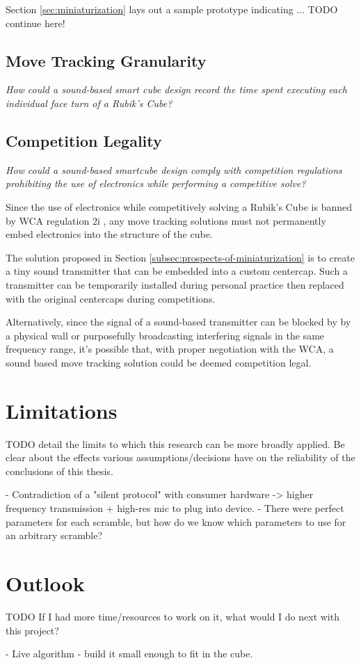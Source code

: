 Section \ref{sec:miniaturization} lays out a sample prototype indicating ... TODO continue here!

\subsection{Move Tracking Granularity}
\label{subsec:answer-granularity}

\emph{How could a sound-based smart cube design record the time spent
executing each individual face turn of a Rubik's Cube?}



\subsection{Competition Legality}
\label{subsec:answer-competition-legality}

\emph{How could a sound-based smartcube design comply with competition
regulations prohibiting the use of electronics while performing a
competitive solve?}

Since the use of electronics while competitively solving a Rubik's Cube
is banned by WCA regulation 2i \cite{wca-regulations}, any move
tracking solutions must not permanently embed electronics into the
structure of the cube.

The solution proposed in Section
\ref{subsec:prospects-of-miniaturization} is to create a tiny sound
transmitter that can be embedded into a custom centercap. Such a
transmitter can be temporarily installed during personal practice then
replaced with the original centercaps during competitions.

Alternatively, since the signal of a sound-based transmitter can be
blocked by by a physical wall or purposefully broadcasting interfering
signals in the same frequency range, it's possible that, with proper
negotiation with the WCA, a sound based move tracking solution could be
deemed competition legal.


\section{Limitations}

TODO detail the limits to which this research can be more broadly
applied. Be clear about the effects various assumptions/decisions have
on the reliability of the conclusions of this thesis.

- Contradiction of a "silent protocol" with consumer hardware -> higher frequency transmission + high-res mic to plug into device.
- There were perfect parameters for each scramble, but how do we know which parameters to use for an arbitrary scramble?


\section{Outlook}

TODO If I had more time/resources to work on it, what would I do next
with this project?

- Live algorithm
- build it small enough to fit in the cube.